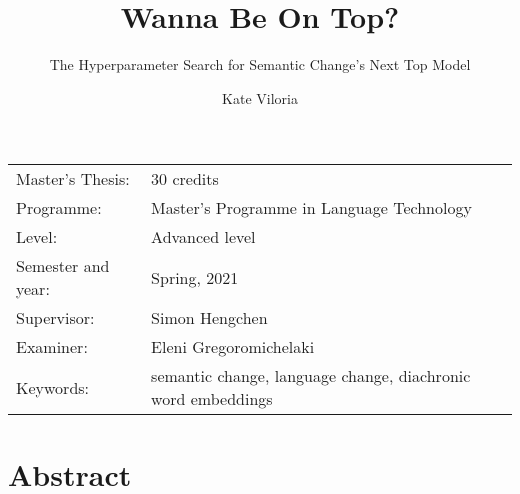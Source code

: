 \documentclass[11pt, a4paper]{article}
\title{Wanna Be On Top?}
\subtitle{The Hyperparameter Search for Semantic Change's Next Top Model}
\author{Kate Viloria}
\begin{document}
\begin{titlepage}

\maketitle

\vfill

\begingroup
\renewcommand*{\arraystretch}{1.2}
\begin{tabular}{l@{\hskip 20mm}l}
\hline
Master's Thesis: & 30 credits \\
Programme: & Master’s Programme in Language Technology\\
Level: & Advanced level \\
Semester and year: & Spring, 2021\\
Supervisor: & Simon Hengchen\\
Examiner: & Eleni Gregoromichelaki\\
Keywords: & semantic change, language change, diachronic word embeddings
\end{tabular}
\endgroup

\thispagestyle{empty}
\end{titlepage}

\newpage
\singlespacing
\section*{Abstract}
\end{document}
